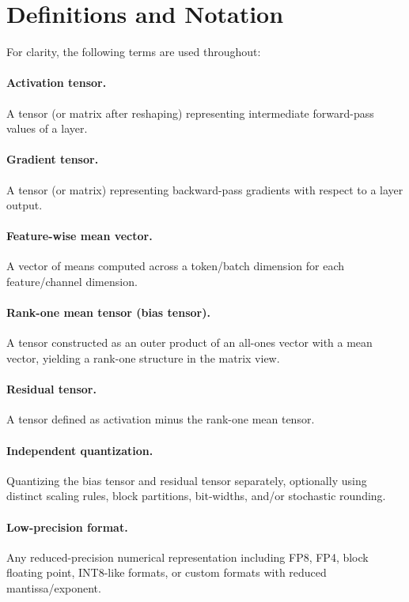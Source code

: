 \documentclass[11pt]{article}
\begin{document}
\section{Definitions and Notation}
For clarity, the following terms are used throughout:

\paragraph{Activation tensor.}
A tensor (or matrix after reshaping) representing intermediate forward-pass values of a layer.

\paragraph{Gradient tensor.}
A tensor (or matrix) representing backward-pass gradients with respect to a layer output.

\paragraph{Feature-wise mean vector.}
A vector of means computed across a token/batch dimension for each feature/channel dimension.

\paragraph{Rank-one mean tensor (bias tensor).}
A tensor constructed as an outer product of an all-ones vector with a mean vector, yielding a rank-one structure in the matrix view.

\paragraph{Residual tensor.}
A tensor defined as activation minus the rank-one mean tensor.

\paragraph{Independent quantization.}
Quantizing the bias tensor and residual tensor separately, optionally using distinct scaling rules, block partitions, bit-widths, and/or stochastic rounding.

\paragraph{Low-precision format.}
Any reduced-precision numerical representation including FP8, FP4, block floating point, INT8-like formats, or custom formats with reduced mantissa/exponent.
\end{document}
